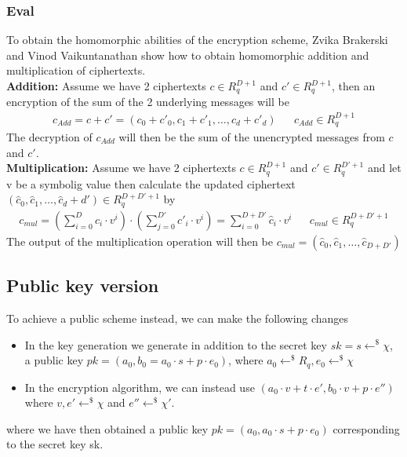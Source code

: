 \documentclass[../main.tex]{subfiles}
\begin{document}
\subsubsection{Eval}
To obtain the homomorphic abilities of the encryption scheme, Zvika Brakerski and Vinod Vaikuntanathan show
how to obtain homomorphic addition and multiplication of ciphertexts.
\\[2mm]
\textbf{Addition:} Assume we have 2 ciphertexts $c \in R_q^{D+1}$ and $c' \in R_q^{D+1}$, then an encryption
of the sum of the 2 underlying messages will be
\begin{align*}
    c_{Add} = c + c' = (c_0 + c'_0, c_1 + c'_1, \dots , c_d + c'_d) &  & c_{Add} \in R_q^{D + 1}
\end{align*}
The decryption of $c_{Add}$ will then be the sum of the unencrypted messages from $c$ and $c'$.
\\[2mm]
\textbf{Multiplication:} Assume we have 2 ciphertexts $c \in R_q^{D+1}$ and $c' \in R_q^{D'+1}$ and let v be a symbolig value
then calculate the updated ciphertext
\\
$(\hat{c}_0, \hat{c}_1, \dots, \hat{c}_d+d') \in R_q^{D + D' + 1}$ by
\begin{align*}
    c_{mul} = (\sum_{i=0}^D c_i \cdot v^i) \cdot
    (\sum_{j=0}^{D'} c'_i \cdot v^i) =
    \sum_{i=0}^{D+D'} \hat{c}_i \cdot v^i
     &  & c_{mul} \in R_q^{D+D'+1}
\end{align*}
The output of the multiplication operation will then be $c_{mul} = (\hat{c}_0, \hat{c}_1, \dots, \hat{c}_{D+D'})$

\subsection{Public key version}
To achieve a public scheme instead, we can make the following changes
\begin{itemize}
    \item In the key generation we generate in addition to the secret key $sk = s \leftarrow^{\$} \chi$, a public key
        $pk = (a_0 , b_0 = a_0 \cdot s + p \cdot e_0)$, where $a_0 \leftarrow^{\$} R_q, e_0 \leftarrow^{\$} \chi$
    \item In the encryption algorithm, we can instead use
        $(a_0 \cdot v + t \cdot e', b_0 \cdot v + p \cdot e'')$ where
        $v, e' \leftarrow^{\$} \chi$ and $e'' \leftarrow^{\$} \chi '$.
\end{itemize} 
where we have then obtained a public key $pk = (a_0, a_0 \cdot s + p \cdot e_0)$
corresponding to the secret key sk.
\end{document}
